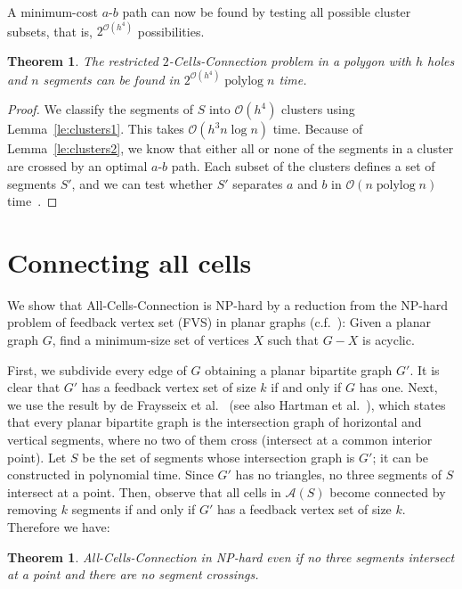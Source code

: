 \documentclass[11pt,a4paper]{article}
\newtheorem{theorem}[definition]{Theorem}
\DeclareMathOperator{\polylog}{polylog}
\begin{document}
A minimum-cost $a$-$b$ path can now be found by testing all possible cluster subsets, that is, $2^{{\mathcal O}(h^4)}$ possibilities.

\begin{theorem}
The restricted {\sc $2$-Cells-Connection} problem in a polygon with $h$ holes and $n$ segments can be found in $2^{{\mathcal O}(h^4)}\polylog n$ time.
\end{theorem}
\begin{proof}
We classify the segments of $S$ into ${\mathcal O}(h^4)$ clusters using Lemma~\ref{le:clusters1}. This takes ${\mathcal O}(h^3 n\log n)$ time. Because 
of Lemma~\ref{le:clusters2}, we know that either all or none of the segments in a cluster are crossed by an optimal $a$-$b$ path. Each subset of the clusters defines 
a set of segments $S'$, and we can test whether $S'$ separates $a$ and $b$ in ${\mathcal O}(n\polylog n)$ time~\cite{single-face1,single-face2}. 
\end{proof}


\section{Connecting all cells}\label{allcells}

We show that {\sc All-Cells-Connection} is NP-hard by a reduction from the NP-hard problem of feedback vertex set (FVS) in planar graphs (c.f.~\cite{V01}): Given a planar graph $G$, find a minimum-size set of vertices $X$ such that $G-X$ is acyclic. 

First, we subdivide every edge of $G$ obtaining a planar bipartite graph $G'$. It is clear that $G'$ has a feedback vertex set of size $k$ if and only if $G$ has one.  Next, we use the result by de Fraysseix et al.~\cite{dFMP91} (see also Hartman et al.~\cite{HNZ91}), 
which states that every planar bipartite graph is the intersection graph of horizontal and vertical segments, where no two of them cross (intersect at a common interior point). Let $S$ be the set of segments whose intersection graph is $G'$; it can be constructed in polynomial time. Since $G'$ has no triangles, no three segments of $S$ intersect at a point. Then, observe that all cells in $\mathcal{A}(S)$ become connected by removing $k$ segments if and only if $G'$ has a feedback vertex set of size $k$. Therefore we have:

\begin{theorem}
{\sc All-Cells-Connection} in NP-hard even if no three segments intersect at a point and there are no segment crossings.
\end{theorem}
\end{document}
